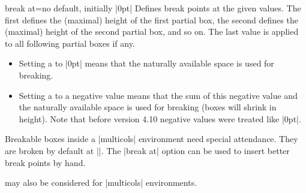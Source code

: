 \clearpage
\begin{docTcbKey}[][doc updated=2017-07-05]{break at}{=}{no default, initially |0pt|}
  Defines break points at the given  values.
  The first  defines the (maximal) height of the first partial box,
  the second  defines the (maximal) height of the second partial box,
  and so on. The last  value is applied to all following partial boxes if any.
  \begin{itemize}
  \item Setting a  to |0pt| means that the naturally available
        space is used for breaking.
  \item Setting a  to a negative value means that
        the sum of this negative value and the naturally available space is used
        for breaking (boxes will shrink in height).
        Note that before version 4.10 negative values were treated like |0pt|.
  \end{itemize}
\begin{dispExample}
\begin{multicols}{3}\footnotesize
Breakable boxes inside a |multicols| environment need special attendance.
They are broken by default at |\textheight|.
The |break at| option can be used to insert better break points by hand.
\begin{tcolorbox}[enhanced jigsaw,size=small,vfill before first,
  colframe=red,colback=yellow!10!white,before title=\raggedright,
  title={Broken box inside a |multicols| environment},fonttitle=\bfseries,
  enforce breakable,%
  pad at break=1mm,break at=3cm/6.3cm ]
\lipsum[1]
\end{tcolorbox}
 may also be considered for |multicols| environments.
\end{multicols}
\end{dispExample}
\end{docTcbKey}

\enlargethispage*{1cm}

